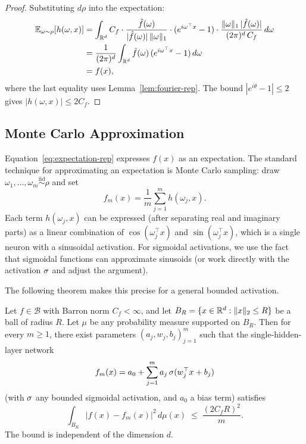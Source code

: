 \documentclass[11pt,a4paper]{article}
\begin{document}
\begin{proof}
Substituting $d\rho$ into the expectation:
\begin{align*}
  \mathbb{E}_{\omega \sim \rho}[h(\omega, x)]
  &= \int_{\mathbb{R}^d} C_f \cdot \frac{\hat{f}(\omega)}{|\hat{f}(\omega)|
    \, \|\omega\|_1} \cdot (e^{i\omega^\top x} - 1) \cdot
    \frac{\|\omega\|_1 \, |\hat{f}(\omega)|}{(2\pi)^d \, C_f} \,
    d\omega \\
  &= \frac{1}{(2\pi)^d} \int_{\mathbb{R}^d} \hat{f}(\omega) \,
    (e^{i\omega^\top x} - 1) \, d\omega \\
  &= f(x),
\end{align*}
where the last equality uses Lemma~\ref{lem:fourier-rep}.  The bound
$|e^{i\theta} - 1| \le 2$ gives $|h(\omega,x)| \le 2C_f$.
\end{proof}

\subsection{Monte Carlo Approximation}
\label{sec:monte-carlo}

Equation~\eqref{eq:expectation-rep} expresses $f(x)$ as an expectation.
The standard technique for approximating an expectation is Monte Carlo
sampling: draw $\omega_1, \ldots, \omega_m \stackrel{\text{iid}}{\sim}
\rho$ and set
\[
  f_m(x) = \frac{1}{m} \sum_{j=1}^{m} h(\omega_j, x).
\]
Each term $h(\omega_j, x)$ can be expressed (after separating real and
imaginary parts) as a linear combination of $\cos(\omega_j^\top x)$ and
$\sin(\omega_j^\top x)$, which is a single neuron with a sinusoidal
activation.  For sigmoidal activations, we use the fact that sigmoidal
functions can approximate sinusoids (or work directly with the activation
$\sigma$ and adjust the argument).

The following theorem makes this precise for a general bounded activation.

\begin{theorem}[Barron, 1993]
\label{thm:barron}
Let $f \in \mathcal{B}$ with Barron norm $C_f < \infty$, and let $B_R =
\{x \in \mathbb{R}^d : \|x\|_2 \le R\}$ be a ball of radius $R$.  Let $\mu$ be
any probability measure supported on $B_R$.  Then for every $m \ge 1$,
there exist parameters $(a_j, w_j, b_j)_{j=1}^m$ such that the
single-hidden-layer network
\[
  f_m(x) = a_0 + \sum_{j=1}^{m} a_j \, \sigma(w_j^\top x + b_j)
\]
(with $\sigma$ any bounded sigmoidal activation, and $a_0$ a bias term)
satisfies
\begin{equation}
\label{eq:barron-bound}
  \int_{B_R} |f(x) - f_m(x)|^2 \, d\mu(x) \;\le\;
  \frac{(2 C_f R)^2}{m}.
\end{equation}
The bound is independent of the dimension $d$.
\end{theorem}
\end{document}
